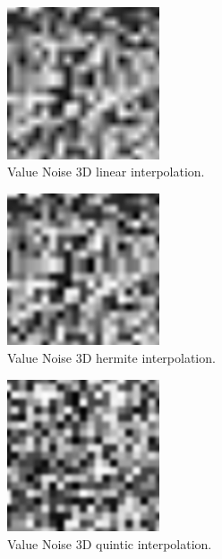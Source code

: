 \begin{figure}[h]
\centering
\includegraphics[width=0.4\textwidth]{out/noise_functions/value_noise3D_linearInterp.png}
\caption{Value Noise 3D linear interpolation.}
\label{fig:value_noise3D_linearInterp}
\end{figure}

\begin{figure}[h]
\centering
\includegraphics[width=0.4\textwidth]{out/noise_functions/value_noise3D_hermiteInterp.png}
\caption{Value Noise 3D hermite interpolation.}
\label{fig:value_noise3D_hermiteInterp}
\end{figure}

\begin{figure}[h]
\centering
\includegraphics[width=0.4\textwidth]{out/noise_functions/value_noise2D_quinticInterp.png}
\caption{Value Noise 3D quintic interpolation.}
\label{fig:value_noise2D_quinticInterp}
\end{figure}

